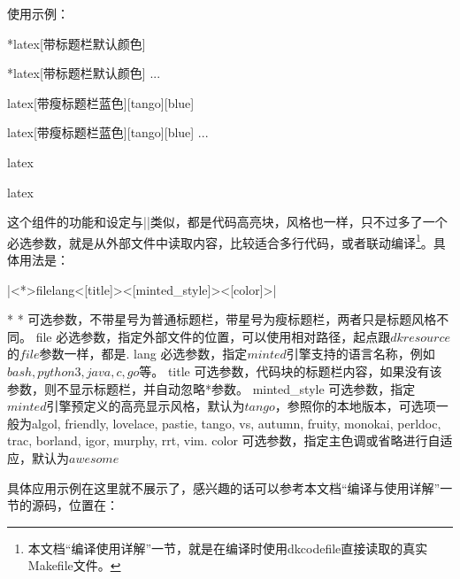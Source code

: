 使用示例：

\begin{dkcode}*{latex}[带标题栏默认颜色]
\begin{dkcode}*{latex}[带标题栏默认颜色]
  ...
\end{dkcode}

\begin{dkcode}{latex}[带瘦标题栏蓝色][tango][blue]
\begin{dkcode}{latex}[带瘦标题栏蓝色][tango][blue]
  ...
\end{dkcode}

\begin{dkcode}{latex}
\begin{dkcode}{latex}
\end{dkcode}

这个组件的功能和设定与|\dkcode|类似，都是代码高亮块，风格也一样，只不过多了一个必选参数，就是从外部文件中读取内容，比较适合多行代码，或者联动编译\footnote{本文档“编译使用详解”一节，就是在编译时使用dkcodefile直接读取的真实Makefile文件。}。具体用法是：

|\dkcodefile<*>{file}{lang}<[title]><[minted_style]><[color]>|

\begin{cvskills}*
  \cvskill
  {*}
  {可选参数，不带星号为普通标题栏，带星号为瘦标题栏，两者只是标题风格不同。}
  \cvskill
  {file}
  {必选参数，指定外部文件的位置，可以使用相对路径，起点跟$dkresource$的$file$参数一样，都是.}
  \cvskill
  {lang}
  {必选参数，指定$minted$引擎支持的语言名称，例如$bash, python3, java, c, go$等。}
  \cvskill
  {title}
  {可选参数，代码块的标题栏内容，如果没有该参数，则不显示标题栏，并自动忽略*参数。}
  \cvskill
  {minted\_style}
  {可选参数，指定$minted$引擎预定义的高亮显示风格，默认为$tango$，参照你的本地版本，可选项一般为algol, friendly, lovelace, pastie, tango, vs, autumn, fruity, monokai, perldoc, trac, borland, igor, murphy, rrt, vim.}
  \cvskill
  {color}
  {可选参数，指定主色调或省略进行自适应，默认为$awesome$}
\end{cvskills}


具体应用示例在这里就不展示了，感兴趣的话可以参考本文档“编译与使用详解”一节的源码，位置在：



\end{dkcode}
\end{dkcode}
\end{dkcode}
